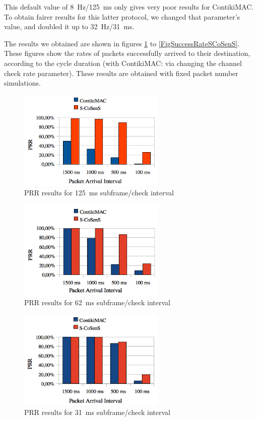 \documentclass[12pt,a4paper]{article}
\begin{document}
This default value of 8~Hz/125~ms only gives very poor results for ContikiMAC.
To obtain fairer results for this latter protocol, we changed that
parameter's value, and doubled it up to 32~Hz/31~ms.

The results we obtained are shown in figures \ref{FigSuccessRate8Hz} to
\ref{FigSuccessRateSCoSenS}. These figures show the rates of packets
successfully arrived to their destination, according to the cycle
duration (with ContikiMAC: via changing the channel check rate parameter).
These results are obtained with fixed packet number simulations.

\begin{figure}[tbph]
  \centering
  \includegraphics[width=7cm]{graphes/PRR8Hz.png}
  \caption{PRR results for 125~ms subframe/check interval}
  \label{FigSuccessRate8Hz}
\end{figure}
\begin{figure}[tbph]
  \centering
  \includegraphics[width=7cm]{graphes/PRR16Hz.png}
  \caption{PRR results for 62~ms subframe/check interval}
  \label{FigSuccessRate16Hz}
\end{figure}
\begin{figure}[tbph]
  \centering
  \includegraphics[width=7cm]{graphes/PRR32Hz.png}
  \caption{PRR results for 31~ms subframe/check interval}
  \label{FigSuccessRate32Hz}
\end{figure}
\end{document}
